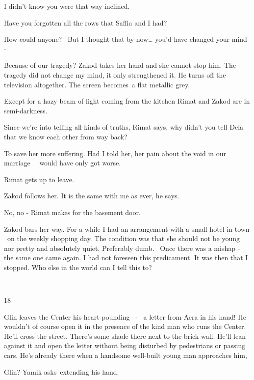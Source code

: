 \documentclass[letterpaper]{article}
\begin{document}
{\textquotedbl}I didn't know you were that way inclined.{\textquotedbl} 

{\textquotedbl}Have you forgotten all the rows that Saffia and I had?{\textquotedbl} 

{\textquotedbl}How could anyone? \ But I thought that by now{\dots} you'd have changed your mind -{\textquotedbl}

{\textquotedbl}Because of our tragedy?{\textquotedbl} Zakod takes her hand and she cannot stop him. {\textquotedbl}The
tragedy did not change my mind, it only strengthened it.{\textquotedbl} He turns off the television altogether. The
screen becomes~a flat metallic grey.

Except for a hazy beam of light coming\textcolor[rgb]{0.8901961,0.42352942,0.039215688}{ }from the kitchen Rimat and
Zakod are in semi-darkness. 

{\textquotedbl}Since we're into telling all kinds of truths,{\textquotedbl} Rimat says, {\textquotedbl}why didn't you
tell Dela that we know each other from way back?{\textquotedbl} 

{\textquotedbl}To save her more suffering. Had I told her, her pain about the void in our marriage \ \ would have only
got worse.{\textquotedbl} 

Rimat gets up to leave.

Zakod follows her. {\textquotedbl}It is the same with me as ever,{\textquotedbl} he says. 

{\textquotedbl}No, no -{\textquotedbl} Rimat makes for the basement door. 

Zakod bars her way. {\textquotedbl}For a while I had an arrangement with a small hotel in town \ on the weekly shopping
day. The condition was that she should not be young nor pretty and absolutely quiet. Preferably dumb. ~Once there was a
mishap - the same one came again. I had not foreseen this predicament. It was then that I stopped. Who else in the
world can I tell this to?{\textquotedbl} 

~

18 

Glin leaves the Center his heart pounding \ {}- \ a letter from Aera in his hand! He wouldn't of course open it in the
presence of the kind man who runs the Center. He'll cross the street. There's some shade there next to the brick wall.
He'll lean against it and open the letter without being disturbed by pedestrians or passing cars. He's already there
when a handsome well-built young man approaches him,~

{\textquotedbl}Glin?{\textquotedbl} Yamik asks~extending his hand. 
\end{document}

